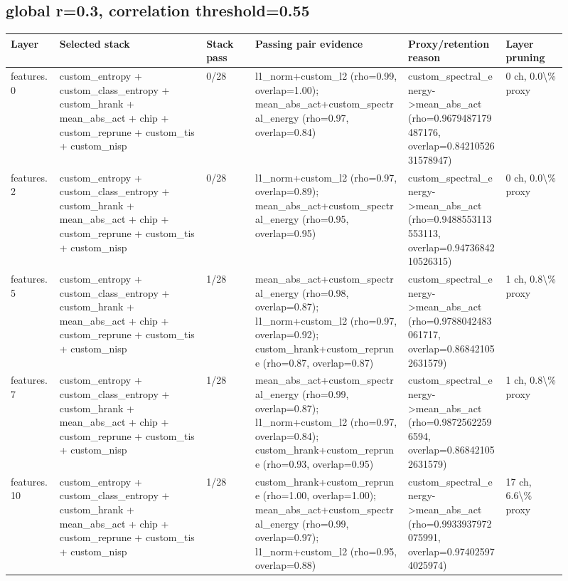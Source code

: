 \documentclass[10pt]{article}
\begin{document}
\subsection*{global r=0.3, correlation threshold=0.55}
\scriptsize
\begin{longtable}{p{0.08\linewidth}p{0.24\linewidth}p{0.08\linewidth}p{0.25\linewidth}p{0.16\linewidth}p{0.10\linewidth}}
\toprule
Layer & Selected stack & Stack pass & Passing pair evidence & Proxy/retention reason & Layer pruning \\
\midrule
\endhead
features.0 & custom\_entropy + custom\_class\_entropy + custom\_hrank + mean\_abs\_act + chip + custom\_reprune + custom\_tis + custom\_nisp & 0/28 & l1\_norm+custom\_l2 (rho=0.99, overlap=1.00); mean\_abs\_act+custom\_spectral\_energy (rho=0.97, overlap=0.84) & custom\_spectral\_energy->mean\_abs\_act (rho=0.9679487179487176, overlap=0.8421052631578947) & 0 ch, 0.0\textbackslash{}\% proxy \\
features.2 & custom\_entropy + custom\_class\_entropy + custom\_hrank + mean\_abs\_act + chip + custom\_reprune + custom\_tis + custom\_nisp & 0/28 & l1\_norm+custom\_l2 (rho=0.97, overlap=0.89); mean\_abs\_act+custom\_spectral\_energy (rho=0.95, overlap=0.95) & custom\_spectral\_energy->mean\_abs\_act (rho=0.9488553113553113, overlap=0.9473684210526315) & 0 ch, 0.0\textbackslash{}\% proxy \\
features.5 & custom\_entropy + custom\_class\_entropy + custom\_hrank + mean\_abs\_act + chip + custom\_reprune + custom\_tis + custom\_nisp & 1/28 & mean\_abs\_act+custom\_spectral\_energy (rho=0.98, overlap=0.87); l1\_norm+custom\_l2 (rho=0.97, overlap=0.92); custom\_hrank+custom\_reprune (rho=0.87, overlap=0.87) & custom\_spectral\_energy->mean\_abs\_act (rho=0.9788042483061717, overlap=0.868421052631579) & 1 ch, 0.8\textbackslash{}\% proxy \\
features.7 & custom\_entropy + custom\_class\_entropy + custom\_hrank + mean\_abs\_act + chip + custom\_reprune + custom\_tis + custom\_nisp & 1/28 & mean\_abs\_act+custom\_spectral\_energy (rho=0.99, overlap=0.87); l1\_norm+custom\_l2 (rho=0.97, overlap=0.84); custom\_hrank+custom\_reprune (rho=0.93, overlap=0.95) & custom\_spectral\_energy->mean\_abs\_act (rho=0.98725622596594, overlap=0.868421052631579) & 1 ch, 0.8\textbackslash{}\% proxy \\
features.10 & custom\_entropy + custom\_class\_entropy + custom\_hrank + mean\_abs\_act + chip + custom\_reprune + custom\_tis + custom\_nisp & 1/28 & custom\_hrank+custom\_reprune (rho=1.00, overlap=1.00); mean\_abs\_act+custom\_spectral\_energy (rho=0.99, overlap=0.97); l1\_norm+custom\_l2 (rho=0.95, overlap=0.88) & custom\_spectral\_energy->mean\_abs\_act (rho=0.9933937972075991, overlap=0.974025974025974) & 17 ch, 6.6\textbackslash{}\% proxy \\

\end{longtable}
\end{document}
